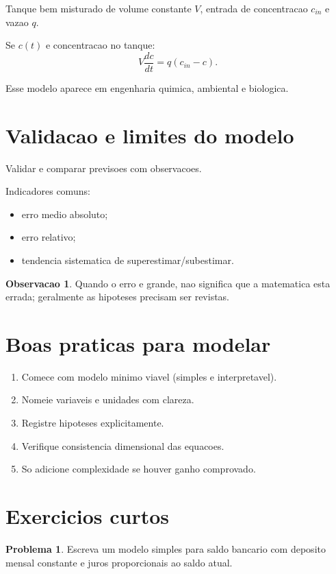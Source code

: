 \documentclass[12pt,a4paper,oneside]{book}
\theoremstyle{definition}
\newtheorem{remark}[definition]{Observacao}
\newtheorem{problem}{Problema}
\begin{document}
Tanque bem misturado de volume constante $V$, entrada de concentracao $c_{in}$ e vazao $q$.

Se $c(t)$ e concentracao no tanque:
\begin{equation}
V\frac{dc}{dt}=q(c_{in}-c).
\end{equation}

Esse modelo aparece em engenharia quimica, ambiental e biologica.

\section{Validacao e limites do modelo}

Validar e comparar previsoes com observacoes.

Indicadores comuns:
\begin{itemize}
    \item erro medio absoluto;
    \item erro relativo;
    \item tendencia sistematica de superestimar/subestimar.
\end{itemize}

\begin{remark}
Quando o erro e grande, nao significa que a matematica esta errada; geralmente as hipoteses precisam ser revistas.
\end{remark}

\section{Boas praticas para modelar}

\begin{enumerate}
    \item Comece com modelo minimo viavel (simples e interpretavel).
    \item Nomeie variaveis e unidades com clareza.
    \item Registre hipoteses explicitamente.
    \item Verifique consistencia dimensional das equacoes.
    \item So adicione complexidade se houver ganho comprovado.
\end{enumerate}

\section{Exercicios curtos}

\begin{problem}
Escreva um modelo simples para saldo bancario com deposito mensal constante e juros proporcionais ao saldo atual.
\end{problem}
\end{document}
